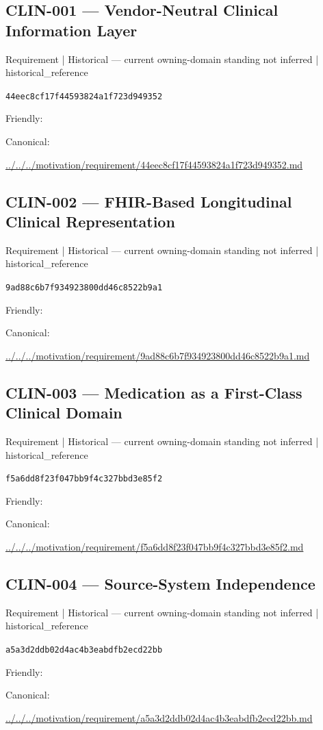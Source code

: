 \documentclass[10pt,a4paper]{article}
\begin{document}
\subsection*{CLIN-001 — Vendor-Neutral Clinical Information Layer}
{\small Requirement | Historical — current owning-domain standing not inferred | historical\_reference}\par
\texttt{44eec8cf17f44593824a1f723d949352}\par
Friendly: \par
Canonical: \par
{\footnotesize\url{../../../motivation/requirement/44eec8cf17f44593824a1f723d949352.md}}\par
\subsection*{CLIN-002 — FHIR-Based Longitudinal Clinical Representation}
{\small Requirement | Historical — current owning-domain standing not inferred | historical\_reference}\par
\texttt{9ad88c6b7f934923800dd46c8522b9a1}\par
Friendly: \par
Canonical: \par
{\footnotesize\url{../../../motivation/requirement/9ad88c6b7f934923800dd46c8522b9a1.md}}\par
\subsection*{CLIN-003 — Medication as a First-Class Clinical Domain}
{\small Requirement | Historical — current owning-domain standing not inferred | historical\_reference}\par
\texttt{f5a6dd8f23f047bb9f4c327bbd3e85f2}\par
Friendly: \par
Canonical: \par
{\footnotesize\url{../../../motivation/requirement/f5a6dd8f23f047bb9f4c327bbd3e85f2.md}}\par
\subsection*{CLIN-004 — Source-System Independence}
{\small Requirement | Historical — current owning-domain standing not inferred | historical\_reference}\par
\texttt{a5a3d2ddb02d4ac4b3eabdfb2ecd22bb}\par
Friendly: \par
Canonical: \par
{\footnotesize\url{../../../motivation/requirement/a5a3d2ddb02d4ac4b3eabdfb2ecd22bb.md}}\par
\end{document}
